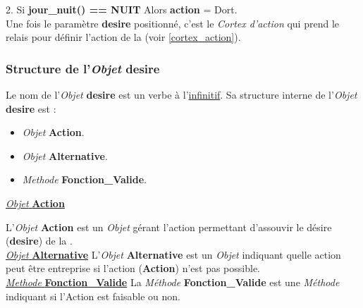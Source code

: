 \documentclass[french]{report}
\begin{document}
2. Si \textbf{jour\_nuit() == NUIT}  Alors \textbf{action}  = Dort.\\

Une fois le paramètre \textbf{desire} positionné, c'est le \textit{Cortex d'action} qui prend le relais pour définir l'action de la \CoCiX (voir \ref{cortex_action}).\\

\subsubsection{Structure de l'\textit{Objet} desire}
Le nom de l'\textit{Objet} \textbf{desire} est un verbe à l'\underline{infinitif}. Sa structure interne de l'\textit{Objet} \textbf{desire} est :\\
\begin{itemize}
	\item \textit{Objet} \textbf{Action}.
	\item \textit{Objet} \textbf{Alternative}.
	\item \textit{Methode} \textbf{Fonction\_Valide}.\\
\end{itemize}

\underline{\textit{Objet} \textbf{Action}}

L'\textit{Objet} \textbf{Action} est un \textit{Objet} gérant l'action permettant d'assouvir le désire (\textbf{desire}) de la \CoCiX.\\

\underline{\textit{Objet} \textbf{Alternative}}
L'\textit{Objet} \textbf{Alternative} est un \textit{Objet} indiquant quelle action peut être entreprise si l'action (\textbf{Action}) n'est pas possible.\\

\underline{\textit{Methode} \textbf{Fonction\_Valide}}
La \textit{Méthode} \textbf{Fonction\_Valide} est une \textit{Méthode} indiquant si l'Action est faisable ou non.\\
\end{document}
